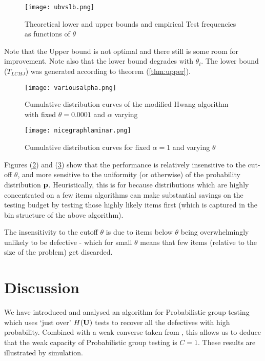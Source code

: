 \begin{figure}[h]
\centering
\texttt{[image: ubvslb.png]}
\caption{Theoretical lower and upper bounds and empirical Test frequencies as functions of \(\theta\)}
\label{ubvslb}
\end{figure}

Note that the Upper bound is not optimal and there still is some room for improvement. Note also that the lower bound degrades with \(\theta_i \). The lower bound (\(T_{LCHJ}\)) was generated according to theorem (\ref{thm:upper}). 

\begin{figure}[h]
\centering
\texttt{[image: variousalpha.png]}
\caption{Cumulative distribution curves of the modified Hwang algorithm with fixed \(\theta = 0.0001\) and \(\alpha\) varying }
\label{testsvsalpha}
\end{figure}

\begin{figure}[h]
\centering
\texttt{[image: nicegraphlaminar.png]}
\caption{Cumulative distribution curves for fixed \(\alpha = 1\) and varying \(\theta\)}
\label{testsvstheta}
\end{figure}

Figures (\ref{testsvsalpha}) and (\ref{testsvstheta}) show that the performance is relatively insensitive to the cut-off \(\theta\), and more sensitive to the uniformity (or otherwise) of the probability distribution \({\mathbf{ p}}\). Heuristically, this is for because distributions which are highly concentrated on a few items algorithms can make substantial savings on the testing budget by testing those highly likely items first (which is captured in the bin structure of the above algorithm). 

The insensitivity to the cutoff \(\theta\) is due to items below \(\theta\) being overwhelmingly unlikely to be defective - which for small \(\theta\) means that few items (relative to the size of the problem) get discarded.

\section{Discussion}
%
We have introduced and analysed an algorithm for Probabilistic group testing which uses `just over' $H({\mathbf{ U}})$ tests to
recover all the defectives with high probability. Combined with a weak converse taken from \cite{li5}, this allows us to deduce that
the weak capacity of Probabilistic group testing is $C=1$.  
These results are illustrated by simulation.

